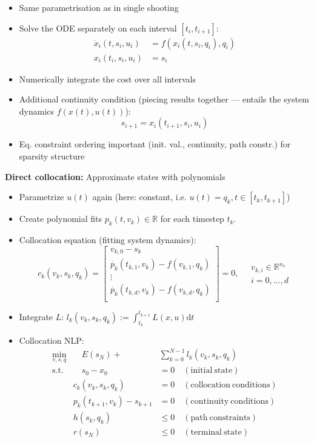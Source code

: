 \begin{tcolorbox}[colback=violet!5!white,colframe=violet!75!black,title=\textbf{Direct
    Approach}]
  \begin{itemize}
  \item Same parametrisation as in single shooting
  \item Solve the ODE separately on each interval $[t_i,t_{i+1}]$:
    \begin{align*}
      \dot{x}_i(t, s_i, u_i) &= f(x_i(t,s_i,q_i),q_i) \\
      x_i(t_i,s_i,u_i) &= s_i
    \end{align*}
  \item Numerically integrate the cost over all intervals
  \item Additional continuity condition (piecing results together --- entails
    the system dynamics $f(x(t),u(t))$):
    \[s_{i+1}=x_i(t_{i+1},s_i,u_i)\]
  \item Eq. constraint ordering important (init. val.,
    continuity, path constr.) for sparsity structure
  \end{itemize}
  \textbf{Direct collocation:} Approximate states with polynomials\\
  \begin{itemize}
  \item Parametrize $u(t)$ again (here: constant, i.e. $u(t)=q_k, t\in [t_k,t_{k+1}]$)
  \item Create polynomial fits $p_k(t, v_k)\in \mathbb{R}$ for each timestep $t_k$.
  \item Collocation equation (fitting system dynamics):
    \[c_k(v_k,s_k,q_k)=
      \left[
        \begin{array}{c}
          v_{k,0}-s_k \\
          \dot{p_k}(t_{k,1},v_k) - f(v_{k,1}, q_k) \\
          \vdots \\
          \dot{p_k}(t_{k,d},v_k) - f(v_{k,d}, q_k) \\
        \end{array}
      \right]=0,
      \quad
      \begin{array}{c}
        v_{k,i}\in \mathbb{R}^{n_x}\\
        i=0, \dots, d
      \end{array}
    \]
  \item Integrate $L$: $l_k(v_k,s_k,q_k) := \int^{t_{k+1}}_{t_k} L(x,u)\mathrm{d}t$
\item Collocation NLP:
\[
  \begin{array}{rrl}
    \min_{v,s,q}&\quad  E(s_N) + &\sum^{N-1}_{k=0} l_k(v_k,s_k,q_k) \\
    \mathrm{s.t.}&\quad s_0 - x_0 &= 0\quad \mathrm{(initial\ state)} \\
    &c_k(v_k,s_k,q_k) &= 0 \quad \mathrm{(collocation\ conditions)} \\ 
    &p_k(t_{k+1},v_k) - s_{k+1} &= 0\quad \mathrm{(continuity\ conditions)} \\
    &h(s_k,q_k)&\le 0\quad \mathrm{(path\ constraints)} \\
    & r(s_N) &\le 0\quad \mathrm{(terminal\ state)}
  \end{array}
\]
  \end{itemize}
\end{tcolorbox}
